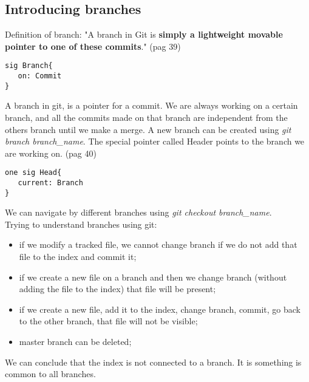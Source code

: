 \subsection{Introducing branches}
Definition of branch: "A branch in Git is {\bf simply a 
lightweight movable pointer to one of these commits}." \cite{progit} 
(pag 39)\\

\begin{lstlisting}
sig Branch{
   on: Commit
}
\end{lstlisting}

A branch in git, is a pointer for a commit. We are always 
working on a certain branch, and all the commits made on 
that branch are independent from the others branch until we 
make a merge. A new branch can be created using 
\emph{git branch branch\_name}. The special pointer called Header 
points to the branch we are working on. \cite{progit} (pag 40)

\begin{lstlisting}
one sig Head{
   current: Branch
}
\end{lstlisting}

We can navigate by different branches using 
\emph{git checkout branch\_name}.\\


Trying to understand branches using git:
\begin{itemize}
   \item if we modify a tracked file, we cannot change branch if we do not add that file to the index and commit it;
   \item if we create a new file on a branch and then we change branch (without adding the file to the index) that file will be present;
   \item if we create a new file, add it to the index, change branch, commit, go back to the other branch, that file will not be visible;
   \item master branch can be deleted;
\end{itemize}

We can conclude that the index is not connected to a branch. It is something is common to all branches.

